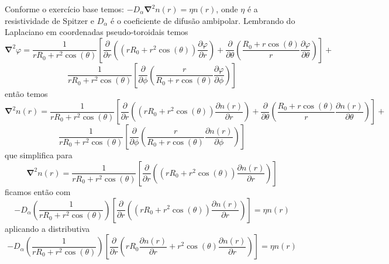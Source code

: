 \documentclass[12pt,oneside,a4paper]{abntex2}
\begin{document}
Conforme o exercício base temos: $-D_\alpha \bm{\nabla}^2 n(r)=\eta n(r)$, onde $\eta$ é a resistividade de Spitzer e $D_\alpha$ é o coeficiente de difusão ambipolar. Lembrando do Laplaciano em coordenadas pseudo-toroidais temos
\begin{equation*}
\bm{\nabla}^2 \varphi = \frac{1}{r R_0 + r^2 \cos(\theta)}  \left[  \dfrac{\partial}{\partial r} \left( (r R_0 + r^2 \cos(\theta))\dfrac{\partial \varphi}{\partial r} \right)+\dfrac{\partial}{\partial \theta} \left( \frac{R_0 + r\cos(\theta)}{r}\dfrac{\partial \varphi}{\partial \theta} \right)\right]+
\end{equation*}
\begin{equation*}
\frac{1}{r R_0 + r^2 \cos(\theta)}  \left[ \dfrac{\partial}{\partial \phi} \left( \frac{r}{R_0 + r\cos(\theta)}\dfrac{\partial \varphi}{\partial \phi} \right)  \right]
\end{equation*}
então temos
\begin{equation*}
\bm{\nabla}^2 n(r) = \frac{1}{r R_0 + r^2 \cos(\theta)}  \left[  \dfrac{\partial}{\partial r} \left( (r R_0 + r^2 \cos(\theta))\dfrac{\partial n(r)}{\partial r} \right)+\dfrac{\partial}{\partial \theta} \left( \frac{R_0 + r\cos(\theta)}{r}\dfrac{\partial n(r)}{\partial \theta} \right)\right]+
\end{equation*}
\begin{equation*}
\frac{1}{r R_0 + r^2 \cos(\theta)}  \left[ \dfrac{\partial}{\partial \phi} \left( \frac{r}{R_0 + r\cos(\theta)}\dfrac{\partial n(r)}{\partial \phi} \right)  \right]
\end{equation*}
que simplifica para
\begin{equation*}
\bm{\nabla}^2 n(r) = \frac{1}{r R_0 + r^2 \cos(\theta)}  \left[  \dfrac{\partial}{\partial r} \left( (r R_0 + r^2 \cos(\theta))\dfrac{\partial n(r)}{\partial r} \right) \right]
\end{equation*}
ficamos então com
\begin{equation*}
-D_\alpha \left( \frac{1}{r R_0 + r^2 \cos(\theta)} \right) \left[  \dfrac{\partial}{\partial r} \left( (r R_0 + r^2 \cos(\theta))\dfrac{\partial n(r)}{\partial r} \right) \right] =\eta n(r)
\end{equation*}
aplicando a distributiva
\begin{equation*}
-D_\alpha \left( \frac{1}{r R_0 + r^2 \cos(\theta)} \right) \left[ \dfrac{\partial}{\partial r} \left( r R_0 \dfrac{\partial n(r)}{\partial r} + r^2 \cos(\theta)\dfrac{\partial n(r)}{\partial r} \right) \right] =\eta n(r)
\end{equation*}
\end{document}
